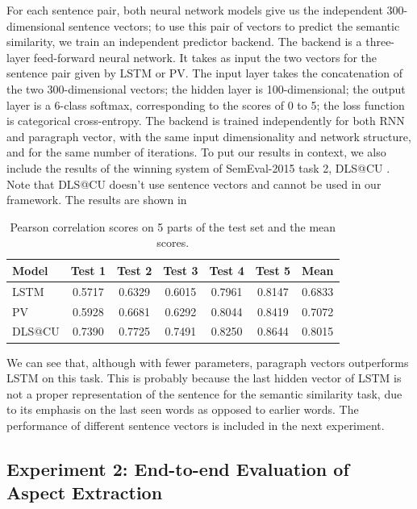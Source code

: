 For each sentence pair, both neural network models give us the 
independent 300-dimensional sentence vectors; to use this pair of vectors to 
predict the semantic similarity, we train an independent predictor backend.
The backend is a three-layer feed-forward neural network.
It takes as input the two vectors for the sentence pair given by LSTM or PV.
The input layer takes the concatenation of the two 300-dimensional vectors;
the hidden layer is 100-dimensional; 
the output layer is a 6-class softmax, corresponding to the scores of 0 to 5;
the loss function is categorical cross-entropy.
The backend is trained independently for both RNN and paragraph vector, 
with the same input dimensionality and network structure, 
and for the same number of iterations. 
To put our results in context, we also include the results of 
the winning system of SemEval-2015 task 2, DLS@CU \cite{dlscu}. Note that
DLS@CU doesn't use sentence vectors and cannot be used in our framework.
The results are shown in 

\begin{table}
\centering
\caption{Pearson correlation scores on 5 parts of the test set and the mean scores.}
\label{table:semeval}
\begin{tabular}{|l|c|c|c|c|c|c|}
    \hline
    Model & Test 1 & Test 2 & Test 3 & Test 4 & Test 5 & Mean \\ \hline\hline
    LSTM  & 0.5717 & 0.6329 & 0.6015 & 0.7961 & 0.8147 & 0.6833 \\ \hline
    PV    & 0.5928 & 0.6681 & 0.6292 & 0.8044 & 0.8419 & 0.7072 \\ \hline
    DLS@CU & 0.7390 & 0.7725 & 0.7491 & 0.8250 & 0.8644 & 0.8015 \\ \hline
\end{tabular}
\end{table}

We can see that, although with fewer parameters, 
paragraph vectors outperforms LSTM on this task. 
This is probably because the last hidden vector of LSTM is not 
a proper representation of the sentence for the semantic similarity task, 
due to its emphasis on the last seen words as opposed to earlier words. 
The performance of different sentence vectors is included in the next experiment.


\subsection{Experiment 2: End-to-end Evaluation of Aspect Extraction}

